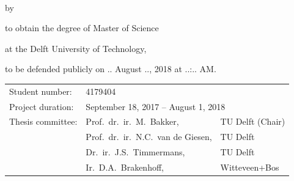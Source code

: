 \begin{titlepage}


\begin{center}

 
{\makeatletter
\largetitlestyle\color{tudelft-cyan}\fontsize{32}{32}\selectfont\@title
\makeatother}

\bigskip
\bigskip

{\makeatletter
\ifx\@subtitle\undefined\else
    \bigskip
   {\tudsffamily\fontsize{20}{20}\selectfont\@subtitle} \\
\fi
\makeatother}

\bigskip
\bigskip

by

\bigskip
\bigskip

{\makeatletter
\largetitlestyle\fontsize{16}{16}\selectfont\@author
\makeatother}

\bigskip
\bigskip

to obtain the degree of Master of Science

at the Delft University of Technology,

to be defended publicly on .. August .., 2018 at ..:.. AM.

\vfill

\begin{tabular}{lll}
    Student number: & 4179404 \\
    Project duration: & \multicolumn{2}{l}{September 18, 2017 -- August 1, 2018} \\
    Thesis committee: & Prof.\ dr.\ ir.\ M.\ Bakker, & TU Delft (Chair) \\
		& Prof.\ dr.\ ir.\ N.C.\ van de Giesen, & TU Delft \\        
        & Dr.\ ir.\ J.S.\ Timmermans, & TU Delft \\
        & Ir.\ D.A.\ Brakenhoff, & Witteveen+Bos
\end{tabular}

\bigskip
\bigskip


\end{center}
\end{titlepage}
